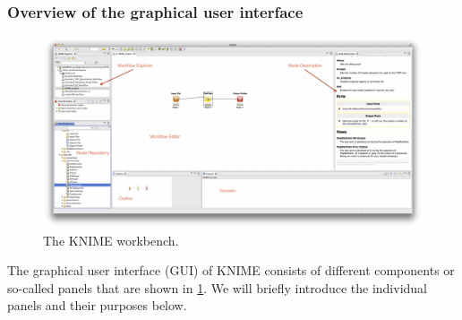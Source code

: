 \subsubsection{Overview of the graphical user interface}

\begin{figure}
\includegraphics[width=\textwidth]{graphics/knime_setup/knime_workbench_marked}
\caption{The KNIME workbench.}
\label{fig:knime_workbench}
\end{figure}

The graphical user interface (GUI) of KNIME consists of different components or so-called panels that are shown in \cref{fig:knime_workbench}.
We will briefly introduce the individual panels and their purposes below.

